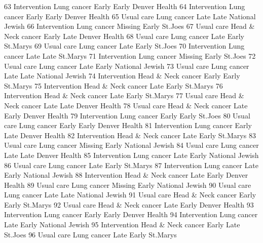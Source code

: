 \documentclass[
  letterpaper,
  DIV=11,
  numbers=noendperiod]{scrreprt}
\newenvironment{Shaded}{\begin{snugshade}}{\end{snugshade}}
\newcommand{\NormalTok}[1]{\textcolor[rgb]{0.00,0.23,0.31}{#1}}
\begin{document}
\begin{Shaded}
\begin{Highlighting}[]
\NormalTok{63  Intervention        Lung cancer   Early Early   Denver Health}
\NormalTok{64  Intervention        Lung cancer   Early Early   Denver Health}
\NormalTok{65    Usual care        Lung cancer    Late  Late National Jewish}
\NormalTok{66  Intervention        Lung cancer Missing Early         St.Joes}
\NormalTok{67    Usual care Head \& Neck cancer   Early  Late   Denver Health}
\NormalTok{68    Usual care        Lung cancer    Late Early        St.Marys}
\NormalTok{69    Usual care        Lung cancer    Late Early         St.Joes}
\NormalTok{70  Intervention        Lung cancer    Late  Late        St.Marys}
\NormalTok{71  Intervention        Lung cancer Missing Early         St.Joes}
\NormalTok{72    Usual care        Lung cancer    Late Early National Jewish}
\NormalTok{73    Usual care        Lung cancer    Late  Late National Jewish}
\NormalTok{74  Intervention Head \& Neck cancer   Early Early        St.Marys}
\NormalTok{75  Intervention Head \& Neck cancer    Late Early        St.Marys}
\NormalTok{76  Intervention Head \& Neck cancer    Late Early        St.Marys}
\NormalTok{77    Usual care Head \& Neck cancer    Late  Late   Denver Health}
\NormalTok{78    Usual care Head \& Neck cancer    Late Early   Denver Health}
\NormalTok{79  Intervention        Lung cancer   Early Early         St.Joes}
\NormalTok{80    Usual care        Lung cancer   Early Early   Denver Health}
\NormalTok{81  Intervention        Lung cancer   Early  Late   Denver Health}
\NormalTok{82  Intervention Head \& Neck cancer    Late Early        St.Marys}
\NormalTok{83    Usual care        Lung cancer Missing Early National Jewish}
\NormalTok{84    Usual care        Lung cancer    Late  Late   Denver Health}
\NormalTok{85  Intervention        Lung cancer    Late Early National Jewish}
\NormalTok{86    Usual care        Lung cancer    Late Early        St.Marys}
\NormalTok{87  Intervention        Lung cancer    Late Early National Jewish}
\NormalTok{88  Intervention Head \& Neck cancer    Late Early   Denver Health}
\NormalTok{89    Usual care        Lung cancer Missing Early National Jewish}
\NormalTok{90    Usual care        Lung cancer    Late  Late National Jewish}
\NormalTok{91    Usual care Head \& Neck cancer   Early Early        St.Marys}
\NormalTok{92    Usual care Head \& Neck cancer    Late Early   Denver Health}
\NormalTok{93  Intervention        Lung cancer   Early Early   Denver Health}
\NormalTok{94  Intervention        Lung cancer    Late Early National Jewish}
\NormalTok{95  Intervention Head \& Neck cancer   Early  Late         St.Joes}
\NormalTok{96    Usual care        Lung cancer    Late Early        St.Marys}

\end{Highlighting}
\end{Shaded}
\end{document}
